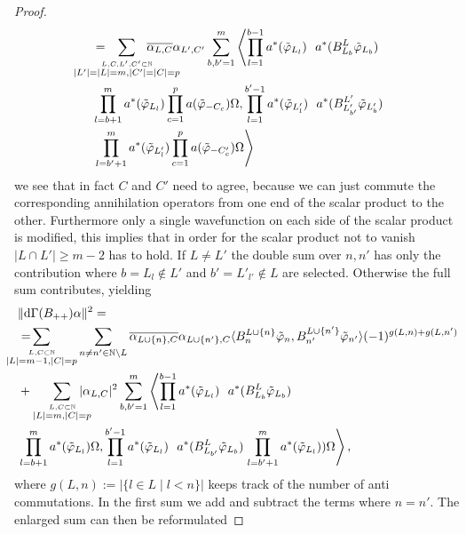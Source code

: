\documentclass[b5paper,draft,openbib,12pt]{memoir}
\begin{document}
\begin{proof}
\begin{align}
&= \hspace{-1cm}\sum_{\overset{L,C, L',C'\subset \mathbb{N}}{|L'|=|L|=m,|C'|=|C|=p}}\hspace{-1cm}\overline{\alpha_{L,C}}\alpha_{L',C'} \sum_{b,b'=1}^m 
\left\langle \prod_{l=1}^{b-1} a^*(\tilde{\varphi}_{L_l})  ~~ a^*(B^{L}_{L_b} \tilde{\varphi}_{L_b})\right.  \\\nonumber
&\prod_{l=b+1}^m a^*(\tilde{\varphi}_{L_l}) \prod_{c=1}^p a(\tilde{\varphi}_{-C_c}) \Omega, 
\prod_{l=1}^{b'-1} a^*(\tilde{\varphi}_{L'_l})  ~~ a^*(B_{L'_{b'}}^{L'} \tilde{\varphi}_{L'_b})  \\
&\left.\prod_{l=b'+1}^m a^*(\tilde{\varphi}_{L'_l}) \prod_{c=1}^p a(\tilde{\varphi}_{-C'_c}) \Omega\right\rangle
\end{align}
we see that in fact \(C\) and \(C'\) need to agree, because we can just commute the corresponding annihilation operators from one end of the 
scalar product to the other. Furthermore only a single wavefunction on each side of the scalar product is modified, this implies that in order for the
scalar product not to vanish \(|L\cap L'|\ge m-2\) has to hold. If \(L\neq L'\) the double sum over \(n,n'\) has only the contribution where 
\(b=L_l \not\in L'\) and \(b'=L'_{l'}\not\in L\) are selected. Otherwise the full sum contributes, yielding
\begin{align}\nonumber
&\|\mathrm{d}\Gamma(B_{++})\alpha\|^2 = \\\nonumber
&= \hspace{-0.8cm}\sum_{\overset{L,C\subset \mathbb{N}}{|L|=m-1,|C|=p}}\sum_{n\neq n'\in\mathbb{N}\backslash L }
\overline{\alpha_{L\cup\{n\},C}}\alpha_{L\cup\{n'\},C}
 \langle B^{L\cup\{n\}}_n \tilde{\varphi}_{n}, B^{L\cup\{n'\}}_{n'}\tilde{\varphi}_{n'}\rangle (-1)^{g(L,n)+g(L,n')}\\\label{B++estimate}
&+\sum_{\overset{L,C\subset \mathbb{N}}{|L|=m,|C|=p}}\hspace{-0.4cm} |\alpha_{L,C}|^2
 \sum_{b,b'=1}^m 
\left\langle \prod_{l=1}^{b-1} a^*(\tilde{\varphi}_{L_l})  ~~ a^*(B^{L}_{L_b} \tilde{\varphi}_{L_b})\right.  \\\nonumber
&\prod_{l=b+1}^m a^*(\tilde{\varphi}_{L_l}) \Omega, 
\prod_{l=1}^{b'-1} a^*(\tilde{\varphi}_{L_l})  ~~ a^*(B_{L_{b'}}^{L} \tilde{\varphi}_{L_b})  \left.\prod_{l=b'+1}^m a^*(\tilde{\varphi}_{L_l}) ) \Omega\right\rangle,
\end{align}
where \(g(L,n):=|\{l\in L \mid l<n\}|\) keeps track of the number of anti commutations. In the first sum we add and subtract the terms 
where \(n=n'\). The enlarged sum can then be reformulated


\end{proof}
\end{document}
